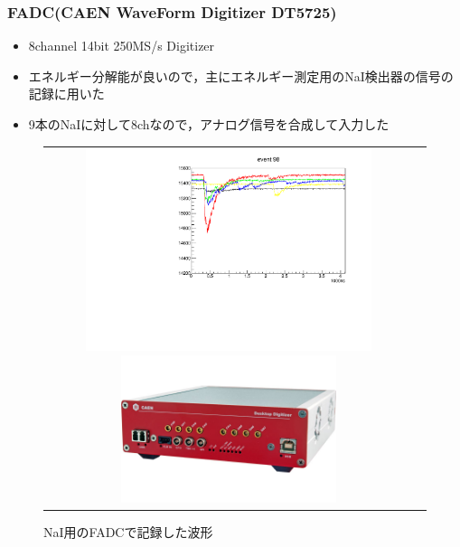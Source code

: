 \subsubsection{FADC(CAEN WaveForm Digitizer DT5725)}
  \begin{itemize}
    \item 8channel 14bit 250MS/s Digitizer
    \item エネルギー分解能が良いので，主にエネルギー測定用のNaI検出器の信号の記録に用いた
    \item 9本のNaIに対して8chなので，アナログ信号を合成して入力した
  \end{itemize}
  \begin{figure}[H]
    \begin{tabular}{cc}
      \begin{minipage}{0.5\hsize}
        \centering
        \includegraphics[width=0.8\textwidth,angle=-90]{figure/hayakawa/NaI_plot.pdf}
        \caption{NaI用のFADCで記録した波形}
      \end{minipage}
      \begin{minipage}{0.4\hsize}
        \centering
        \includegraphics[width=0.6\textwidth]{figure/hayakawa/DT5725_L.png}
      \end{minipage}
    \end{tabular}
  \end{figure}




%
